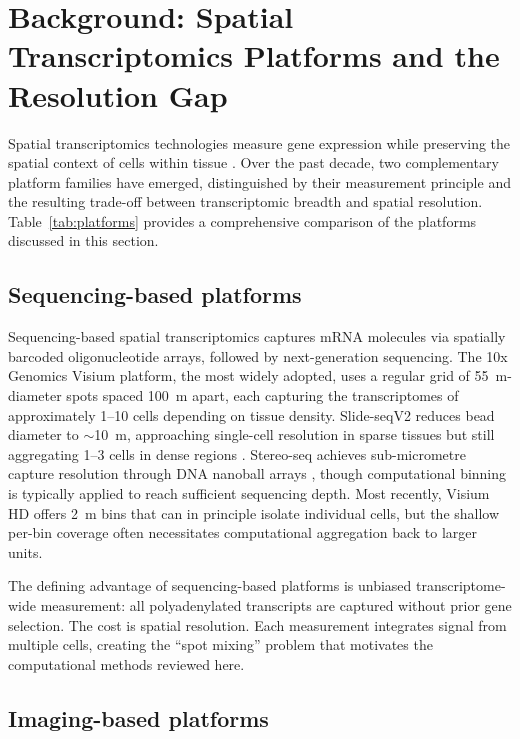 \section{Background: Spatial Transcriptomics Platforms and the Resolution Gap}
\label{sec:background}

Spatial transcriptomics technologies measure gene expression while preserving the spatial context of cells within tissue \citep{stahl2016visualization}. Over the past decade, two complementary platform families have emerged, distinguished by their measurement principle and the resulting trade-off between transcriptomic breadth and spatial resolution. Table~\ref{tab:platforms} provides a comprehensive comparison of the platforms discussed in this section.

\subsection{Sequencing-based platforms}

Sequencing-based spatial transcriptomics captures mRNA molecules via spatially barcoded oligonucleotide arrays, followed by next-generation sequencing. The 10x Genomics Visium platform, the most widely adopted, uses a regular grid of 55~\textmu m-diameter spots spaced 100~\textmu m apart, each capturing the transcriptomes of approximately 1--10 cells depending on tissue density. Slide-seqV2 reduces bead diameter to $\sim$10~\textmu m, approaching single-cell resolution in sparse tissues but still aggregating 1--3 cells in dense regions \citep{stickels2021highly}. Stereo-seq achieves sub-micrometre capture resolution through DNA nanoball arrays \citep{chen2022spatiotemporal}, though computational binning is typically applied to reach sufficient sequencing depth. Most recently, Visium HD offers 2~\textmu m bins that can in principle isolate individual cells, but the shallow per-bin coverage often necessitates computational aggregation back to larger units.

The defining advantage of sequencing-based platforms is unbiased transcriptome-wide measurement: all polyadenylated transcripts are captured without prior gene selection. The cost is spatial resolution. Each measurement integrates signal from multiple cells, creating the ``spot mixing'' problem that motivates the computational methods reviewed here.

\subsection{Imaging-based platforms}

